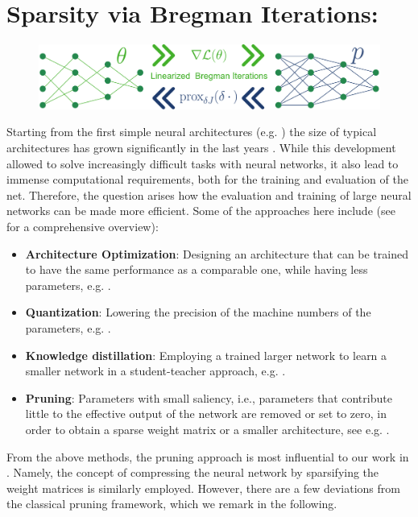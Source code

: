 \section{Sparsity via Bregman Iterations: \cite{bungert2022bregman}}\label{sec:BREG}
%
\begin{figure}
\centering
\includegraphics[width=.5\textwidth]{atelier/Breg_dist/BregmanPosterCartoon.pdf}
\end{figure}
%
%
Starting from the first simple neural architectures (e.g. \cite{rosenblatt1958perceptron}) the size of typical architectures has grown significantly in the last years \cite{hoefler2021sparsity}. While this development allowed to solve increasingly difficult tasks with neural networks, it also lead to immense computational requirements, both for the training and evaluation of the net. Therefore, the question arises how the evaluation and training of large neural networks can be made more efficient. Some of the approaches here include (see \cite{gholami2021survey} for a comprehensive overview):
%
\begin{itemize}
\item \textbf{Architecture Optimization}: Designing an architecture that can be trained to have the same performance as a comparable one, while having less parameters, e.g. \cite{elsken2019neural, howard2017mobilenets}.
%
\item \textbf{Quantization}: Lowering the precision of the machine numbers of the parameters, e.g. \cite{banner2018scalable, courbariaux2014training}.
%
\item \textbf{Knowledge distillation}: Employing a trained larger network to learn a smaller network in a student-teacher approach, e.g. \cite{schmidhuber1992learning, hinton2015distilling}.
%
\item \textbf{Pruning}: Parameters with small saliency, i.e., parameters that contribute little to the effective output of the network are removed or set to zero, in order to obtain a sparse weight matrix or a smaller architecture, see e.g. \cite{lecun1989optimal, hassibi1993optimal}.
\end{itemize}
%
%
From the above methods, the pruning approach is most influential to our work in \cite{bungert2022bregman}. Namely, the concept of compressing the neural network by sparsifying the weight matrices is similarly employed. However, there are a few deviations from the classical pruning framework, which we remark in the following.

